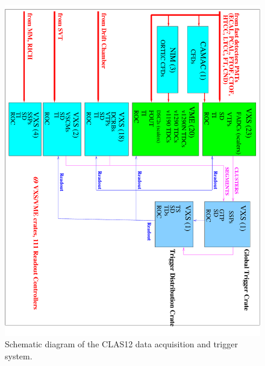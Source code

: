 \documentclass[final,3p,twocolumn]{elsarticle}
\begin{document}
\begin{figure}[htbp!]
\centerline{\includegraphics[angle=90,width=1.0\columnwidth]{clas12-daq-1.pdf}}
\caption{Schematic diagram of the CLAS12 data acquisition and trigger system.}
\label{daq}
\end{figure}
\end{document}

